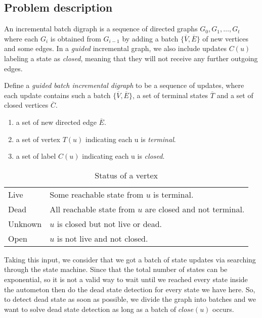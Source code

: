 \subsection{Problem description}
An incremental batch digraph is a sequence of directed graphs $G_0, G_1, \ldots, G_t$ where each $G_i$ is obtained from $G_{i-1}$ by adding a batch $\{\overline V, \overline E\}$ of new vertices and some edges. In a \textsl{guided} incremental graph, we also include updates $C(u)$ labeling a state as \textsl{closed}, meaning that they will not receive any further outgoing edges.

\begin{definition}
    Define a \textsl{guided batch incremental digraph} to be a sequence of updates, where each update contains such a batch $\{\overline V, \overline E\}$, a set of terminal states $\overline T$ and a set of closed vertices $\overline C$.

    \begin{enumerate}
        \item a set of new directed edge $\overline E$.
        \item a set of vertex $T(u)$ indicating each u is \textsl{terminal}.
        \item a set of label $C(u)$ indicating each u is \textsl{closed}.
    \end{enumerate}
\end{definition}

\begin{table}
    \centering
    \begin{tabular}{l|l}
        \hline
        Live & Some reachable state from $u$ is terminal. \\
        Dead & All reachable state from $u$ are closed and not terminal. \\
        Unknown & $u$ is closed but not live or dead. \\
        Open & $u$ is not live and not closed. \\
        \hline
    \end{tabular}
    \caption{Status of a vertex}
    \label{tab:status}
\end{table}

Taking this input, we consider that we got a batch of state updates via searching through the state machine. Since that the total number of states can be exponential, so it is not a valid way to wait until we reached every state inside the autometon then do the dead state detection for every state we have here. So, to detect dead state as soon as possible, we divide the graph into batches and we want to solve dead state detection as long as a batch of $close(u)$ occurs.

